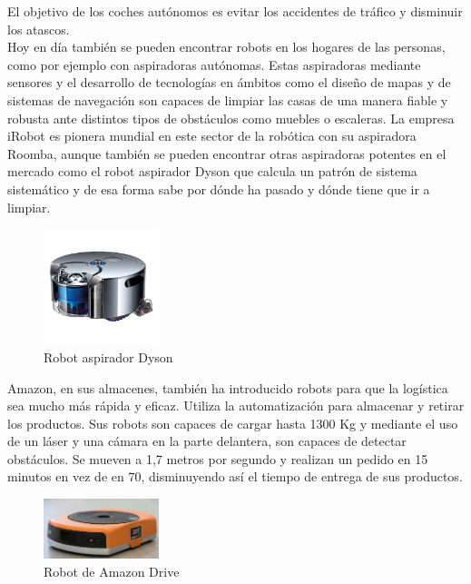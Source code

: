 El objetivo de los coches autónomos es evitar los accidentes de tráfico y disminuir los atascos. \\

Hoy en día también se pueden encontrar robots en los hogares de las personas, como por ejemplo con aspiradoras autónomas. Estas aspiradoras mediante sensores y el desarrollo de tecnologías en ámbitos como el diseño de mapas y de sistemas de navegación son capaces de limpiar las casas de una manera fiable y robusta ante distintos tipos de obstáculos como muebles o escaleras. La empresa iRobot es pionera mundial en este sector de la robótica con su aspiradora Roomba, aunque también se pueden encontrar otras aspiradoras potentes en el mercado como el robot aspirador Dyson que calcula un patrón de sistema sistemático y de esa forma sabe por dónde ha pasado y dónde tiene que ir a limpiar.\\

\begin{figure}[H]
  \begin{center}
    \includegraphics[width=0.3\textwidth]{figures/Introduccion/dyson.jpg}
		\caption{Robot aspirador Dyson}
		\label{fig.dyson}
		\end{center}
\end{figure}

Amazon, en sus almacenes, también ha introducido robots para que la logística sea mucho más rápida y eficaz. Utiliza la automatización para almacenar y retirar los productos. Sus robots son capaces de cargar hasta 1300 Kg y mediante el uso de un láser y una cámara en la parte delantera, son capaces de detectar obstáculos. Se mueven a 1,7 metros por segundo y realizan un pedido en 15 minutos en vez de en 70, disminuyendo así el tiempo de entrega de sus productos.

\begin{figure}[H]
  \begin{center}
    \includegraphics[width=0.3\textwidth]{figures/Introduccion/amazon.jpg}
		\caption{Robot de Amazon Drive}
		\label{fig.amazon}
		\end{center}
\end{figure}

